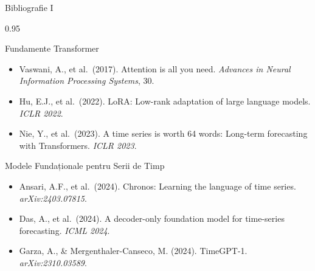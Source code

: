 \documentclass[9pt, aspectratio=169, t]{beamer}
\begin{document}
\begin{frame}{Bibliografie I}
    \begin{cminipage}{0.95\textwidth}
    \begin{block}{Fundamente Transformer}
        {\small
        \begin{itemize}\setlength{\itemsep}{0pt}
            \item Vaswani, A., et al.\ (2017). Attention is all you need. \textit{Advances in Neural Information Processing Systems}, 30.
            \item Hu, E.J., et al.\ (2022). LoRA: Low-rank adaptation of large language models. \textit{ICLR 2022}.
            \item Nie, Y., et al.\ (2023). A time series is worth 64 words: Long-term forecasting with Transformers. \textit{ICLR 2023}.
        \end{itemize}
        }
    \end{block}

    \begin{exampleblock}{Modele Fundaționale pentru Serii de Timp}
        {\small
        \begin{itemize}\setlength{\itemsep}{0pt}
            \item Ansari, A.F., et al.\ (2024). Chronos: Learning the language of time series. \textit{arXiv:2403.07815}.
            \item Das, A., et al.\ (2024). A decoder-only foundation model for time-series forecasting. \textit{ICML 2024}.
            \item Garza, A., \& Mergenthaler-Canseco, M. (2024). TimeGPT-1. \textit{arXiv:2310.03589}.
        \end{itemize}
        }
    \end{exampleblock}
    \end{cminipage}
\end{frame}
\end{document}
